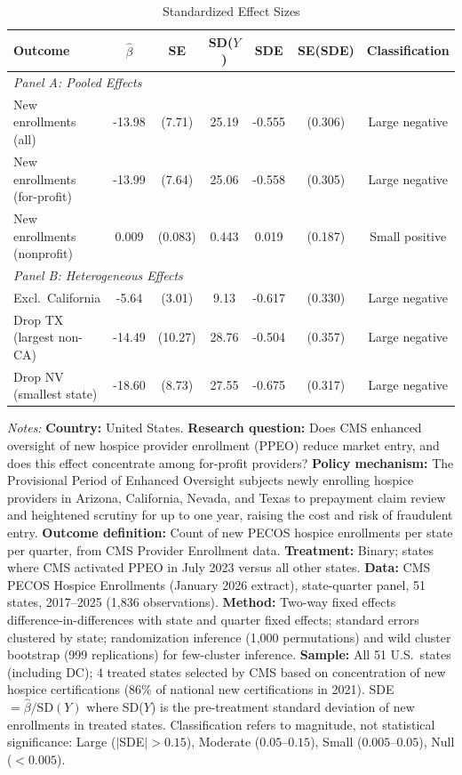 \begin{table}[htbp]
\centering
\caption{Standardized Effect Sizes}
\label{tab:sde}
\small
\begin{tabular}{lcccccc}
\toprule
Outcome & $\hat{\beta}$ & SE & SD($Y$) & SDE & SE(SDE) & Classification \\
\midrule
\multicolumn{7}{l}{\textit{Panel A: Pooled Effects}} \\[3pt]
New enrollments (all) & -13.98 & (7.71) & 25.19 & -0.555 & (0.306) & Large negative \\
New enrollments (for-profit) & -13.99 & (7.64) & 25.06 & -0.558 & (0.305) & Large negative \\
New enrollments (nonprofit) & 0.009 & (0.083) & 0.443 & 0.019 & (0.187) & Small positive \\[6pt]
\multicolumn{7}{l}{\textit{Panel B: Heterogeneous Effects}} \\[3pt]
Excl.\ California & -5.64 & (3.01) & 9.13 & -0.617 & (0.330) & Large negative \\
Drop TX (largest non-CA) & -14.49 & (10.27) & 28.76 & -0.504 & (0.357) & Large negative \\
Drop NV (smallest state) & -18.60 & (8.73) & 27.55 & -0.675 & (0.317) & Large negative \\
\bottomrule
\end{tabular}
\vspace{0.5em}
\begin{minipage}{\textwidth}
\small \textit{Notes:} \textbf{Country:} United States. \textbf{Research question:} Does CMS enhanced oversight of new hospice provider enrollment (PPEO) reduce market entry, and does this effect concentrate among for-profit providers? \textbf{Policy mechanism:} The Provisional Period of Enhanced Oversight subjects newly enrolling hospice providers in Arizona, California, Nevada, and Texas to prepayment claim review and heightened scrutiny for up to one year, raising the cost and risk of fraudulent entry. \textbf{Outcome definition:} Count of new PECOS hospice enrollments per state per quarter, from CMS Provider Enrollment data. \textbf{Treatment:} Binary; states where CMS activated PPEO in July 2023 versus all other states. \textbf{Data:} CMS PECOS Hospice Enrollments (January 2026 extract), state-quarter panel, 51 states, 2017--2025 (1,836 observations). \textbf{Method:} Two-way fixed effects difference-in-differences with state and quarter fixed effects; standard errors clustered by state; randomization inference (1,000 permutations) and wild cluster bootstrap (999 replications) for few-cluster inference. \textbf{Sample:} All 51 U.S.\ states (including DC); 4 treated states selected by CMS based on concentration of new hospice certifications (86\% of national new certifications in 2021). SDE $= \hat{\beta} / \text{SD}(Y)$ where SD($Y$) is the pre-treatment standard deviation of new enrollments in treated states. Classification refers to magnitude, not statistical significance: Large ($|$SDE$| > 0.15$), Moderate ($0.05$--$0.15$), Small ($0.005$--$0.05$), Null ($< 0.005$).
\end{minipage}
\end{table}
